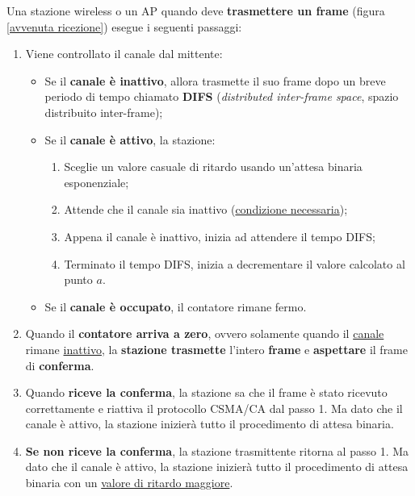 \documentclass[a4paper]{article}
\begin{document}
	\noindent
	Una stazione wireless o un AP quando deve \textbf{trasmettere un frame} (figura \ref{avvenuta ricezione}) esegue i seguenti passaggi:
	\begin{enumerate}
		\item Viene controllato il canale dal mittente:
		\begin{itemize}
			\item Se il \textbf{canale è inattivo}, allora trasmette il suo frame dopo un breve periodo di tempo chiamato \textbf{DIFS} (\emph{distributed inter-frame space}, spazio distribuito inter-frame);
			
			\item Se il \textbf{canale è attivo}, la stazione:
			\begin{enumerate}
				\item Sceglie un valore casuale di ritardo usando un'attesa binaria esponenziale;
				\item Attende che il canale sia inattivo (\underline{condizione necessaria});
				\item Appena il canale è inattivo, inizia ad attendere il tempo DIFS;
				\item Terminato il tempo DIFS, inizia a decrementare il valore calcolato al punto $a$.
			\end{enumerate}
			
			\item Se il \textbf{canale è occupato}, il contatore rimane fermo.
		\end{itemize}
		
		\item Quando il \textbf{contatore arriva a zero}, ovvero solamente quando il \underline{canale} rimane \underline{inattivo}, la \textbf{stazione trasmette} l’intero \textbf{frame} e \textbf{aspettare} il frame di \textbf{conferma}.
		
		\item Quando \textbf{riceve la conferma}, la stazione sa che il frame è stato ricevuto correttamente e riattiva il protocollo CSMA/CA dal passo 1. Ma dato che il canale è attivo, la stazione inizierà tutto il procedimento di attesa binaria.
		
		\item \textbf{Se non riceve la conferma}, la stazione trasmittente ritorna al passo 1. Ma dato che il canale è attivo, la stazione inizierà tutto il procedimento di attesa binaria con un \underline{valore di ritardo maggiore}.
	\end{enumerate}\newpage
\end{document}
